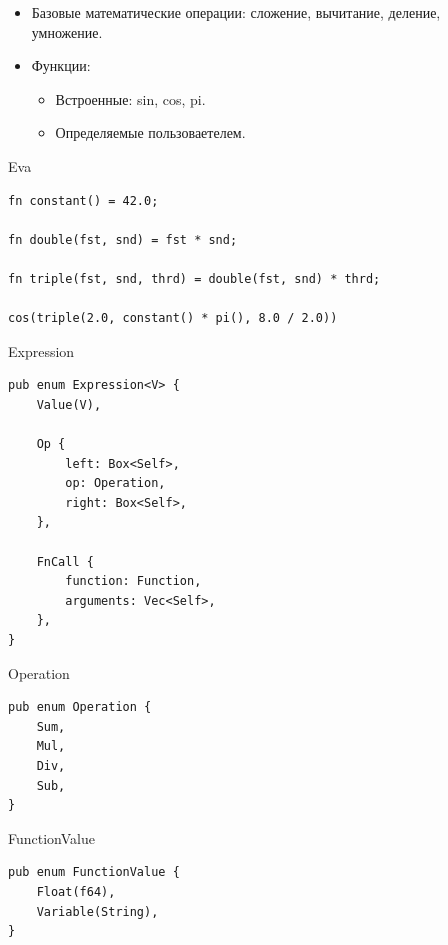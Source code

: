\begin{frame}
    \begin{itemize}
      \item Базовые математические операции: сложение, вычитание, деление, умножение.
      \item Функции:
      \begin{itemize}
        \item Встроенные: sin, cos, pi.
        \item Определяемые пользоваетелем.
      \end{itemize}
    \end{itemize}
\end{frame}

\begin{frame}[fragile]{Eva}
    \begin{verbatim}
fn constant() = 42.0;

fn double(fst, snd) = fst * snd;

fn triple(fst, snd, thrd) = double(fst, snd) * thrd;

cos(triple(2.0, constant() * pi(), 8.0 / 2.0))
    \end{verbatim}
\end{frame}

\begin{frame}[fragile]{Expression}
    \begin{verbatim}
pub enum Expression<V> {
    Value(V),

    Op {
        left: Box<Self>,
        op: Operation,
        right: Box<Self>,
    },

    FnCall {
        function: Function,
        arguments: Vec<Self>,
    },
}
    \end{verbatim}
\end{frame}

\begin{frame}[fragile]{Operation}
    \begin{verbatim}
pub enum Operation {
    Sum,
    Mul,
    Div,
    Sub,
}
    \end{verbatim}
\end{frame}

\begin{frame}[fragile]{FunctionValue}
    \begin{verbatim}
pub enum FunctionValue {
    Float(f64),
    Variable(String),
}
    \end{verbatim}
\end{frame}

